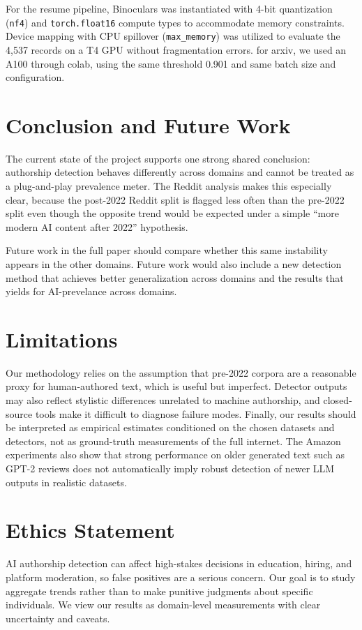 \documentclass[11pt]{article}
\begin{document}
For the resume pipeline, Binoculars was instantiated with 4-bit quantization (\texttt{nf4}) and \texttt{torch.float16} compute types to accommodate memory constraints. Device mapping with CPU spillover (\texttt{max\_memory}) was utilized to evaluate the 4,537 records on a T4 GPU without fragmentation errors.
for arxiv, we used an A100 through colab, using the same threshold 0.901 and same batch size and configuration.

\section{Conclusion and Future Work}
The current state of the project supports one strong shared conclusion:
authorship detection behaves differently across domains and cannot be treated
as a plug-and-play prevalence meter. The Reddit analysis makes this especially
clear, because the post-2022 Reddit split is flagged less often than the
pre-2022 split even though the opposite trend would be expected under a simple
``more modern AI content after 2022'' hypothesis.

Future work in the full paper should compare whether this same instability
appears in the other domains. Future work would also include a new detection method that achieves better generalization across domains and the results that yields for AI-prevelance across domains. 


\section*{Limitations}
Our methodology relies on the assumption that pre-2022 corpora are a reasonable
proxy for human-authored text, which is useful but imperfect. Detector outputs
may also reflect stylistic differences unrelated to machine authorship, and
closed-source tools make it difficult to diagnose failure modes. Finally, our
results should be interpreted as empirical estimates conditioned on the chosen
datasets and detectors, not as ground-truth measurements of the full internet.
The Amazon experiments also show that strong performance on older generated
text such as GPT-2 reviews does not automatically imply robust detection of
newer LLM outputs in realistic datasets.

\section*{Ethics Statement}
AI authorship detection can affect high-stakes decisions in education, hiring,
and platform moderation, so false positives are a serious concern. Our goal is
to study aggregate trends rather than to make punitive judgments about specific
individuals. We view our results as domain-level measurements with clear uncertainty and caveats.
\end{document}
